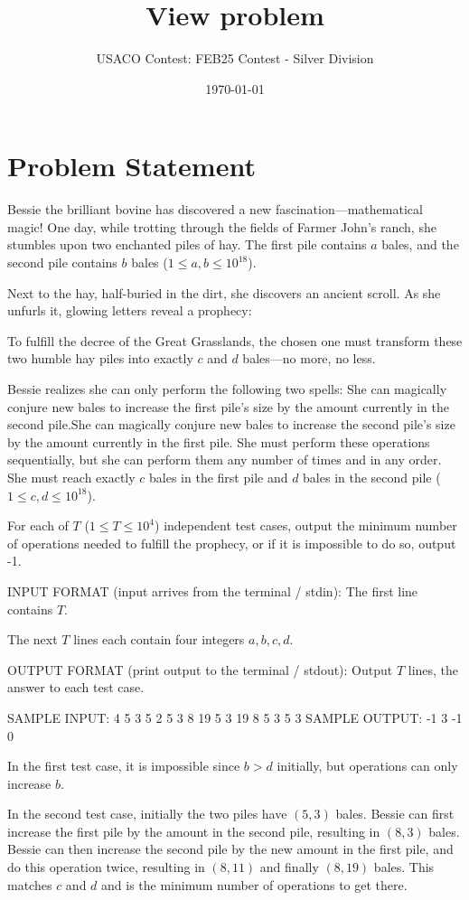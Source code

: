 \documentclass[12pt]{article}
\title{View problem}
\author{USACO Contest: FEB25 Contest - Silver Division}
\date{\today}
\begin{document}
\maketitle

\section*{Problem Statement}


Bessie the brilliant bovine has discovered a new fascination—mathematical
magic! One day, while trotting through the fields of Farmer John’s ranch, she
stumbles upon two enchanted piles of hay. The first pile contains $a$ bales, and
the second pile contains $b$ bales ($1\le a,b\le 10^{18}$).

Next to the hay, half-buried in the dirt, she discovers an ancient scroll. As
she unfurls it, glowing letters reveal a prophecy:

To fulfill the decree of the Great Grasslands, the chosen one must transform
these two humble hay piles into exactly $c$ and $d$ bales—no more, no less.

Bessie realizes she can only perform the following two spells:
She can magically conjure new bales to increase the first pile’s size by
the amount currently in the second pile.She can magically conjure new
bales to increase the second pile’s size by the amount currently in the first
pile.
She must perform these operations sequentially, but she can perform them any
number of times and in any order. She must reach exactly $c$ bales in the first
pile and $d$ bales in the second pile
($1\le c,d\le 10^{18}$).

For each of $T$ ($1\le T\le 10^4$) independent test cases, output the minimum 
number of operations needed to fulfill the prophecy, or if it is impossible to
do so, output -1.

INPUT FORMAT (input arrives from the terminal / stdin):
The first line contains $T$.

The next $T$ lines each contain four integers $a,b,c,d$.

OUTPUT FORMAT (print output to the terminal / stdout):
Output $T$ lines, the answer to each test case.

SAMPLE INPUT:
4
5 3 5 2
5 3 8 19
5 3 19 8
5 3 5 3
SAMPLE OUTPUT: 
-1
3
-1
0

In the first test case, it is impossible since $b>d$ initially, but operations
can only increase $b$.

In the second test case, initially the two piles have $(5, 3)$ bales.  Bessie
can first increase the first pile by the amount in the second pile, resulting in
$(8, 3)$ bales.  Bessie can then increase the second pile by the new amount in
the first pile, and do this operation twice, resulting in $(8, 11)$ and finally
$(8, 19)$ bales.  This matches $c$ and $d$ and is the minimum number of
operations to get there.
\end{document}
